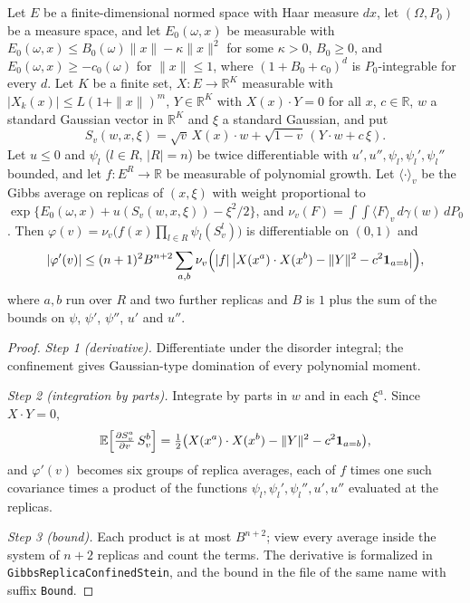 \begin{lemma}\label{lem:sg-tal:st-sqrt-path}
  \leanok
{}
Let $E$ be a finite-dimensional normed space with Haar measure $dx$, let $(\Omega,P_0)$ be a measure space,
and let $E_0(\omega,x)$ be measurable with
$E_0(\omega,x)\le B_0(\omega)\|x\|-\kappa\|x\|^2$ for some $\kappa>0$, $B_0\ge0$, and
$E_0(\omega,x)\ge-c_0(\omega)$ for $\|x\|\le1$, where $(1+B_0+c_0)^d$ is $P_0$-integrable for every $d$.
Let $K$ be a finite set, $X:E\to\mathbb R^K$ measurable with $|X_k(x)|\le L(1+\|x\|)^m$,
$Y\in\mathbb R^K$ with $X(x)\cdot Y=0$ for all $x$, $c\in\mathbb R$, $w$ a standard Gaussian vector in
$\mathbb R^K$ and $\xi$ a standard Gaussian, and put
\[
S_v(w,x,\xi)=\sqrt v\,X(x)\cdot w+\sqrt{1-v}\,(Y\cdot w+c\,\xi).
\]
Let $u\le0$ and $\psi_l$ ($l\in R$, $|R|=n$) be twice differentiable with $u',u'',\psi_l,\psi_l',\psi_l''$
bounded, and let $f:E^R\to\mathbb R$ be measurable of polynomial growth. Let $\langle\cdot\rangle_v$ be the
Gibbs average on replicas of $(x,\xi)$ with weight proportional to
$\exp\{E_0(\omega,x)+u(S_v(w,x,\xi))-\xi^2/2\}$, and $\nu_v(F)=\int\!\!\int\langle F\rangle_v\,d\gamma(w)\,dP_0$.
Then $\varphi(v)=\nu_v\bigl(f(x)\prod_{l\in R}\psi_l(S_v^l)\bigr)$ is differentiable on $(0,1)$ and
\[
|\varphi'(v)|\le(n+1)^2B^{n+2}\sum_{a,b}\nu_v\Bigl(|f|\,\bigl|X(x^a)\cdot X(x^b)-\|Y\|^2-c^2\mathbf 1_{a=b}\bigr|\Bigr),
\]
where $a,b$ run over $R$ and two further replicas and $B$ is $1$ plus the sum of the bounds on
$\psi$, $\psi'$, $\psi''$, $u'$ and $u''$.
\end{lemma}
\begin{proof}
  \leanok
\emph{Step 1 (derivative).} Differentiate under the disorder integral; the confinement gives Gaussian-type
domination of every polynomial moment.

\emph{Step 2 (integration by parts).} Integrate by parts in $w$ and in each $\xi^a$. Since $X\cdot Y=0$,
\[
\mathbb E\Bigl[\tfrac{\partial S_v^a}{\partial v}\,S_v^b\Bigr]
=\tfrac12\bigl(X(x^a)\cdot X(x^b)-\|Y\|^2-c^2\mathbf 1_{a=b}\bigr),
\]
and $\varphi'(v)$ becomes six groups of replica averages, each of $f$ times one such covariance times a
product of the functions $\psi_l,\psi_l',\psi_l'',u',u''$ evaluated at the replicas.

\emph{Step 3 (bound).} Each product is at most $B^{n+2}$; view every average inside the system of $n+2$
replicas and count the terms.
The derivative is formalized in \texttt{GibbsReplicaConfinedStein}, and the bound in the file of the same
name with suffix \texttt{Bound}.
\end{proof}

